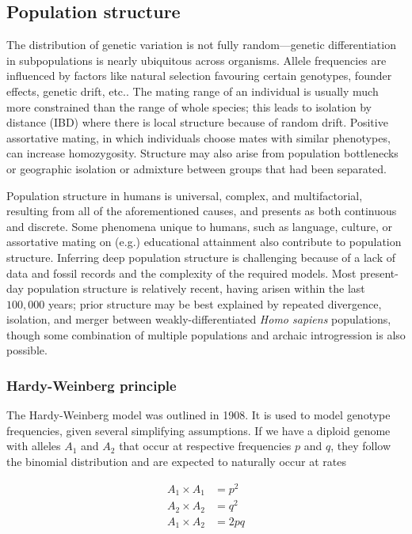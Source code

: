 \subsection{Population structure}

The distribution of genetic variation is not fully random---genetic differentiation in subpopulations is nearly ubiquitous across organisms. Allele frequencies are influenced by factors like natural selection favouring certain genotypes, founder effects, genetic drift, etc.\citep{hartl2007principles_6}. The mating range of an individual is usually much more constrained than the range of whole species; this leads to isolation by distance (IBD) where there is local structure because of random drift\citep{wright_isolation_1943}. Positive assortative mating, in which individuals choose mates with similar phenotypes, can increase homozygosity\citep{hartl2007principles_6}. Structure may also arise from population bottlenecks or geographic isolation\citep{crow_kimura_1970_3} or admixture between groups that had been separated\citep{crow_kimura_1970_9}. 

Population structure in humans is universal, complex, and multifactorial, resulting from all of the aforementioned causes, and presents as both continuous and discrete\citep{peter_geometric_2022}. Some phenomena unique to humans, such as language\citep{barbujani_zones_1990}, culture\citep{campbell_evolution_2010}, or assortative mating on (e.g.) educational attainment\citep{robinson_genetic_2017} also contribute to population structure. Inferring deep population structure is challenging because of a lack of data and fossil records and the complexity of the required models. Most present-day population structure is relatively recent, having arisen within the last $100,000$ years; prior structure may be best explained by repeated divergence, isolation, and merger between weakly-differentiated \textit{Homo sapiens} populations, though some combination of multiple populations and archaic introgression is also possible\citep{ragsdale_weakly_2023}.

\subsubsection{Hardy-Weinberg principle}

The Hardy-Weinberg model was outlined in 1908. It is used to model genotype frequencies, given several simplifying assumptions\citep{hartl2007principles_2}. If we have a diploid genome with alleles $A_{1}$ and $A_{2}$ that occur at respective frequencies $p$ and $q$, they follow the binomial distribution and are expected to naturally occur at rates
\begin{spacing}{1}
\begin{align*} 
A_{1} \times A_{1} &= p^{2}\\
A_{2} \times A_{2} &= q^{2}\\
A_{1} \times A_{2} &= 2pq
\end{align*} 
\end{spacing}

